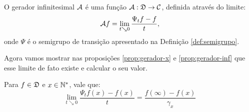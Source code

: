 \begin{definicao}
  \label{def:gerador}
  O gerador infinitesimal ${\mathcal{A}}$ é uma função ${\mathcal{A}}: {\mathfrak{D}} \to {\mathcal{C}}$,
  definida através do limite:
  \begin{equation}
    \label{eq:def-gerador}
    {\mathcal{A}} f = \lim_{t \searrow 0} \frac{\Psi_t f - f}{t},
  \end{equation}
  onde $\Psi$ é o semigrupo de transição apresentado na Definição
  \ref{def:semigrupo}.
\end{definicao}

Agora vamos mostrar nas proposições \ref{prop:gerador-x} e
\ref{prop:gerador-inf} que esse limite de fato existe e calcular o seu
valor.

\begin{proposicao}
  \label{prop:gerador-x}
  Para $f \in {\mathfrak{D}}$ e $x \in {\mathbb{N^*}}$, vale que:
  \begin{equation}
    \label{eq:gerador-x}
    \lim_{t \searrow 0} \frac{\Psi_t f(x) - f(x)}{t} = \frac{f(\infty)
    - f(x)}{\gamma_x}
  \end{equation}
\end{proposicao}

